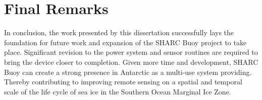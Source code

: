 \pagebreak
\section{Final Remarks}
In conclusion, the work presented by this dissertation successfully lays the foundation for future work and expansion of the SHARC Buoy project to take place. Significant revision to the power system and sensor routines are required to bring the device closer to completion. Given more time and development, SHARC Buoy can create a strong presence in Antarctic as a multi-use system providing. Thereby contributing to improving remote sensing on a spatial and temporal scale of the life cycle of sea ice in the Southern Ocean Marginal Ice Zone.